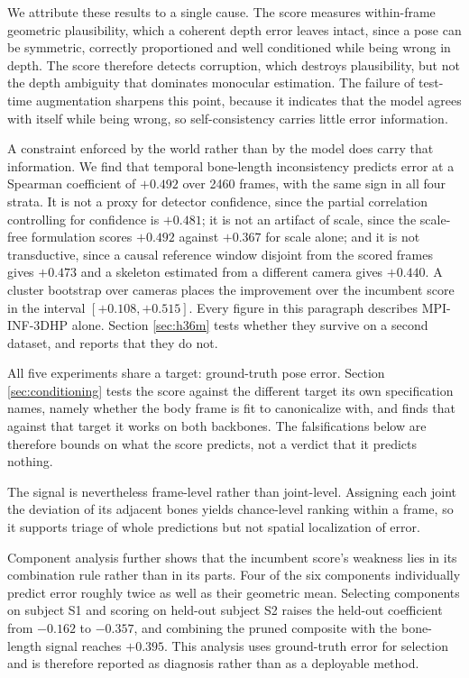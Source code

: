 We attribute these results to a single cause. The score measures within-frame geometric plausibility, which a coherent depth error leaves intact, since a pose can be symmetric, correctly proportioned and well conditioned while being wrong in depth. The score therefore detects corruption, which destroys plausibility, but not the depth ambiguity that dominates monocular estimation. The failure of test-time augmentation sharpens this point, because it indicates that the model agrees with itself while being wrong, so self-consistency carries little error information.

A constraint enforced by the world rather than by the model does carry that information. We find that temporal bone-length inconsistency predicts error at a Spearman coefficient of $+0.492$ over 2460 frames, with the same sign in all four strata. It is not a proxy for detector confidence, since the partial correlation controlling for confidence is $+0.481$; it is not an artifact of scale, since the scale-free formulation scores $+0.492$ against $+0.367$ for scale alone; and it is not transductive, since a causal reference window disjoint from the scored frames gives $+0.473$ and a skeleton estimated from a different camera gives $+0.440$. A cluster bootstrap over cameras places the improvement over the incumbent score in the interval $[+0.108, +0.515]$. Every figure in this paragraph describes MPI-INF-3DHP alone. Section \ref{sec:h36m} tests whether they survive on a second dataset, and reports that they do not.

All five experiments share a target: ground-truth pose error. Section \ref{sec:conditioning} tests the score against the different target its own specification names, namely whether the body frame is fit to canonicalize with, and finds that against that target it works on both backbones. The falsifications below are therefore bounds on what the score predicts, not a verdict that it predicts nothing.

The signal is nevertheless frame-level rather than joint-level. Assigning each joint the deviation of its adjacent bones yields chance-level ranking within a frame, so it supports triage of whole predictions but not spatial localization of error.

Component analysis further shows that the incumbent score's weakness lies in its combination rule rather than in its parts. Four of the six components individually predict error roughly twice as well as their geometric mean. Selecting components on subject S1 and scoring on held-out subject S2 raises the held-out coefficient from $-0.162$ to $-0.357$, and combining the pruned composite with the bone-length signal reaches $+0.395$. This analysis uses ground-truth error for selection and is therefore reported as diagnosis rather than as a deployable method.

